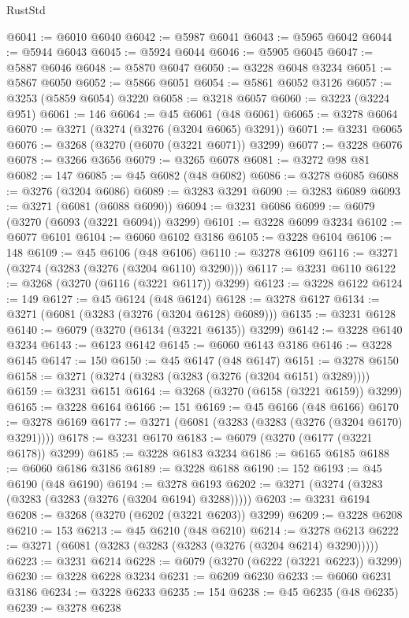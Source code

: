 \begin{lexlean}{RustStd}
\begin{coremodule}
@6041 := @6010 @6040
@6042 := @5987 @6041
@6043 := @5965 @6042
@6044 := @5944 @6043
@6045 := @5924 @6044
@6046 := @5905 @6045
@6047 := @5887 @6046
@6048 := @5870 @6047
@6050 := @3228 @6048 @3234
@6051 := @5867 @6050
@6052 := @5866 @6051
@6054 := @5861 @6052 @3126
@6057 := @3253 (@5859 @6054) @3220
@6058 := @3218 @6057
@6060 := @3223 (@3224 @951)
@6061 := 146
@6064 := @45 @6061 (@48 @6061)
@6065 := @3278 @6064
@6070 := @3271 (@3274 (@3276 (@3204 @6065) @3291))
@6071 := @3231 @6065
@6076 := @3268 (@3270 (@6070 (@3221 @6071)) @3299)
@6077 := @3228 @6076
@6078 := @3266 @3656
@6079 := @3265 @6078
@6081 := @3272 @98 @81
@6082 := 147
@6085 := @45 @6082 (@48 @6082)
@6086 := @3278 @6085
@6088 := @3276 (@3204 @6086)
@6089 := @3283 @3291
@6090 := @3283 @6089
@6093 := @3271 (@6081 (@6088 @6090))
@6094 := @3231 @6086
@6099 := @6079 (@3270 (@6093 (@3221 @6094)) @3299)
@6101 := @3228 @6099 @3234
@6102 := @6077 @6101
@6104 := @6060 @6102 @3186
@6105 := @3228 @6104
@6106 := 148
@6109 := @45 @6106 (@48 @6106)
@6110 := @3278 @6109
@6116 := @3271 (@3274 (@3283 (@3276 (@3204 @6110) @3290)))
@6117 := @3231 @6110
@6122 := @3268 (@3270 (@6116 (@3221 @6117)) @3299)
@6123 := @3228 @6122
@6124 := 149
@6127 := @45 @6124 (@48 @6124)
@6128 := @3278 @6127
@6134 := @3271 (@6081 (@3283 (@3276 (@3204 @6128) @6089)))
@6135 := @3231 @6128
@6140 := @6079 (@3270 (@6134 (@3221 @6135)) @3299)
@6142 := @3228 @6140 @3234
@6143 := @6123 @6142
@6145 := @6060 @6143 @3186
@6146 := @3228 @6145
@6147 := 150
@6150 := @45 @6147 (@48 @6147)
@6151 := @3278 @6150
@6158 := @3271 (@3274 (@3283 (@3283 (@3276 (@3204 @6151) @3289))))
@6159 := @3231 @6151
@6164 := @3268 (@3270 (@6158 (@3221 @6159)) @3299)
@6165 := @3228 @6164
@6166 := 151
@6169 := @45 @6166 (@48 @6166)
@6170 := @3278 @6169
@6177 := @3271 (@6081 (@3283 (@3283 (@3276 (@3204 @6170) @3291))))
@6178 := @3231 @6170
@6183 := @6079 (@3270 (@6177 (@3221 @6178)) @3299)
@6185 := @3228 @6183 @3234
@6186 := @6165 @6185
@6188 := @6060 @6186 @3186
@6189 := @3228 @6188
@6190 := 152
@6193 := @45 @6190 (@48 @6190)
@6194 := @3278 @6193
@6202 := @3271 (@3274 (@3283 (@3283 (@3283 (@3276 (@3204 @6194) @3288)))))
@6203 := @3231 @6194
@6208 := @3268 (@3270 (@6202 (@3221 @6203)) @3299)
@6209 := @3228 @6208
@6210 := 153
@6213 := @45 @6210 (@48 @6210)
@6214 := @3278 @6213
@6222 := @3271 (@6081 (@3283 (@3283 (@3283 (@3276 (@3204 @6214) @3290)))))
@6223 := @3231 @6214
@6228 := @6079 (@3270 (@6222 (@3221 @6223)) @3299)
@6230 := @3228 @6228 @3234
@6231 := @6209 @6230
@6233 := @6060 @6231 @3186
@6234 := @3228 @6233
@6235 := 154
@6238 := @45 @6235 (@48 @6235)
@6239 := @3278 @6238

\end{coremodule}
\end{lexlean}
